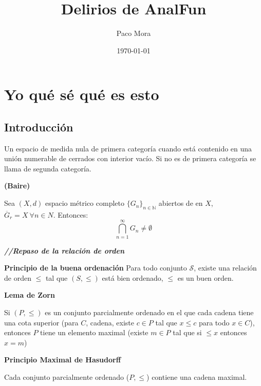 \documentclass[openany]{book}
\title{Delirios de AnalFun}
\author{Paco Mora}
\date{\today}
\begin{document}
\maketitle

\chapter{Yo qué sé qué es esto}

\section{Introducción}

\begin{definition}
    
    Un espacio de medida nula de primera categoría cuando está contenido en una unión numerable de cerrados con interior vacío. Si no es de primera categoría se llama de segunda categoría.
\end{definition}


\begin{theorem}
    \textbf{(Baire)}    

    Sea $ (X,d) $ espacio métrico completo $ \{G_n\}_{n \in \mathbb{N}} $ abiertos de en $ X $, $ \overline{G}_{r} = X\ \forall n \in N $. Entonces:
    $$ \bigcap_{n=1}^{\infty}G_n \ne \emptyset $$
\end{theorem}

\textit{\textbf{//Repaso de la relación de orden}}

\begin{theorem}
    \textbf{Principio de la buena ordenación }
    Para todo conjunto $ \mathcal{S}   $, existe una relación de orden $ \leq  $ tal que $ (S, \leq ) $ está bien ordenado, $ \leq  $ es un buen orden.
\end{theorem}


\begin{theorem}
    \textbf{Lema de Zorn}

    Si $ (P,\leq ) $ es un conjunto parcialmente ordenado en el que cada cadena tiene una cota superior (para $ C $, cadena, existe $ c \in P $ tal que $ x\leq c $ para todo $ x \in C $), entonces $ P $ tiene un elemento maximal (existe $  m \in P $ tal que si $ \leq x $ entonces $ x = m $)
\end{theorem}

\begin{theorem}
    \textbf{Principio Maximal de Hasudorff}

    Cada conjunto parcialmente ordenado ($ P,\leq  $) contiene una cadena maximal.

\end{theorem}
\end{document}
